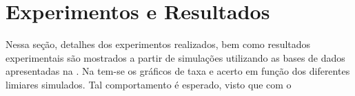 \chapter[Resultados]{Experimentos e Resultados}
\label{resultados}
Nessa seção, detalhes dos experimentos realizados, bem como resultados experimentais são mostrados a partir de simulações utilizando as bases de dados apresentadas na . Na  tem-se os gráficos de taxa e acerto em função dos diferentes limiares simulados. Tal comportamento é esperado, visto que com o 
